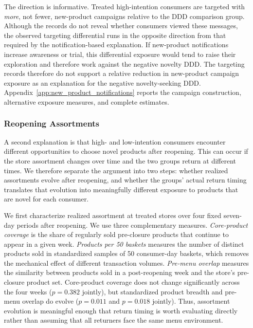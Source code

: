 \documentclass[11 pt]{article}
\begin{document}
The direction is informative. Treated high-intention consumers are targeted with \textit{more}, not fewer, new-product campaigns relative to the DDD comparison group. Although the records do not reveal whether consumers viewed these messages, the observed targeting differential runs in the opposite direction from that required by the notification-based explanation. If new-product notifications increase awareness or trial, this differential exposure would tend to raise their exploration and therefore work against the negative novelty DDD. The targeting records therefore do not support a relative reduction in new-product campaign exposure as an explanation for the negative novelty-seeking DDD. Appendix~\ref{app:new_product_notifications} reports the campaign construction, alternative exposure measures, and complete estimates.

\subsubsection{Reopening Assortments}
\label{section:alternative_assortment}

A second explanation is that high- and low-intention consumers encounter different opportunities to choose novel products after reopening. This can occur if the store assortment changes over time and the two groups return at different times. We therefore separate the argument into two steps: whether realized assortments evolve after reopening, and whether the groups' actual return timing translates that evolution into meaningfully different exposure to products that are novel for each consumer.

We first characterize realized assortment at treated stores over four fixed seven-day periods after reopening. We use three complementary measures. \textit{Core-product coverage} is the share of regularly sold pre-closure products that continue to appear in a given week. \textit{Products per 50 baskets} measures the number of distinct products sold in standardized samples of 50 consumer-day baskets, which removes the mechanical effect of different transaction volumes. \textit{Pre-menu overlap} measures the similarity between products sold in a post-reopening week and the store's pre-closure product set. Core-product coverage does not change significantly across the four weeks ($p=0.382$ jointly), but standardized product breadth and pre-menu overlap do evolve ($p=0.011$ and $p=0.018$ jointly). Thus, assortment evolution is meaningful enough that return timing is worth evaluating directly rather than assuming that all returners face the same menu environment.
\end{document}

